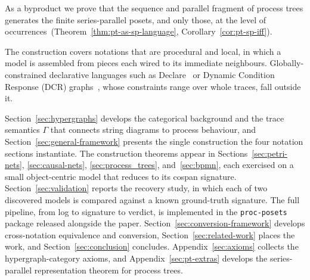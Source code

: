 As a byproduct we prove that the sequence and parallel fragment of process trees generates the
finite series-parallel posets, and only those, at the level of
occurrences~(Theorem~\ref{thm:pt-as-sp-language}, Corollary~\ref{cor:pt-sp-iff}).

The construction covers notations that are procedural and local, in which a model is assembled from
pieces each wired to its immediate neighbours. Globally-constrained declarative languages such as
Declare~\cite{diciccioGeneratingEventLogs2015} or Dynamic Condition Response (DCR)
graphs~\cite{deboisDeclarativeProcessMining2017}, whose constraints range over whole traces, fall
outside it.

Section~\ref{sec:hypergraphs} develops the
categorical background and the trace semantics $\Gamma$ that connects string diagrams to process
behaviour, and Section~\ref{sec:general-framework} presents the single construction the four
notation sections instantiate. The construction theorems appear in Sections~\ref{sec:petri-nets},
\ref{sec:causal-nets}, \ref{sec:process_trees}, and~\ref{sec:bpmn}, each exercised on a small
object-centric model that reduces to its cospan signature. Section~\ref{sec:validation} reports
the recovery study, in which each of two discovered models is compared against a known
ground-truth signature. The full pipeline, from log to signature to verdict, is implemented in the
\texttt{proc-posets} package released alongside the paper. Section~\ref{sec:conversion-framework} develops cross-notation equivalence and
conversion, Section~\ref{sec:related-work} places the work, and Section~\ref{sec:conclusion}
concludes. Appendix~\ref{sec:axioms} collects the hypergraph-category axioms, and
Appendix~\ref{sec:pt-extras} develops the series-parallel representation theorem for process
trees.
